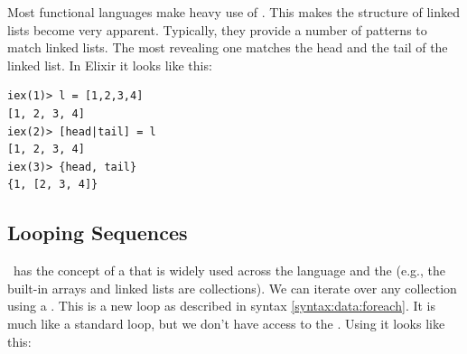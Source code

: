 Most functional languages make heavy use of . This makes the structure of linked lists become very apparent. Typically, they provide a number of patterns to match linked lists. The most revealing one matches the head and the tail of the linked list. In Elixir it looks like this:
\begin{verbatim}
iex(1)> l = [1,2,3,4]
[1, 2, 3, 4]
iex(2)> [head|tail] = l
[1, 2, 3, 4]
iex(3)> {head, tail}
{1, [2, 3, 4]}
\end{verbatim}


%  

\subsection{Looping Sequences}
\label{sec:primdata:sequence:foreach}

\csharp\ has the concept of a  that is widely used across the language and the  (e.g., the built-in arrays and linked lists are collections). We can iterate over any collection using a . This is a new loop as described in syntax \ref{syntax:data:foreach}. It is much like a standard  loop, but we don't have access to the . Using it looks like this: %

\begin{syntaxfloat}
  
  \caption{Statements for repetition with }
  \label{syntax:data:foreach}
\end{syntaxfloat}

